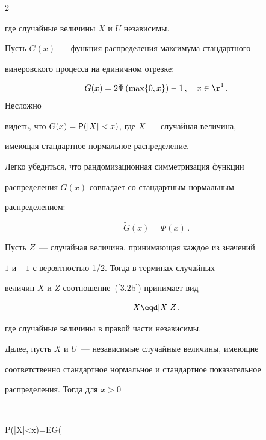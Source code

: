 \begin{multicols}{2}
\begin{equation}
\end{equation}


где случайные величины $X$ и $U$ независимы.





Пусть $G(x)$~--- функция распределения максимума стандартного


винеровского процесса на единичном отрезке:


$$


G(x)=2\Phi\left (\max\{0,x\}\right )-1\,,\quad x\in{\r}^1\,.


$$ Несложно


видеть, что $G(x)={\sf P}(|X|<x)$, где $X$~--- случайная величина,


имеющая стандартное нормальное распределение.





Легко убедиться, что рандомизационная сим\-мет\-ри\-за\-ция функции


распределения $G(x)$ совпадает со стандартным нормальным


распределением:


\begin{equation}


\widetilde G(x)=\Phi(x)\,.\label{3.2b}


\end{equation}


Пусть $Z$~--- случайная величина, принимающая каж\-дое из значений


$1$ и $-1$ с вероятностью 1/2. Тогда в терминах случайных


величин $X$ и $Z$ соотношение~(\ref{3.2b}) принимает вид


\begin{equation}


X\eqd |X| Z\,,\label{3.3b}


\end{equation}


где случайные величины в правой части незави\-симы.





Далее, пусть $X$ и $U$~--- независимые случайные величины, имеющие


соответственно стандартное нормальное и стандартное показательное


распределения. Тогда для $x>0$


$$


{\sf P}\left (|X|<x\right )={\sf E}G\left (



\end{multicols}
